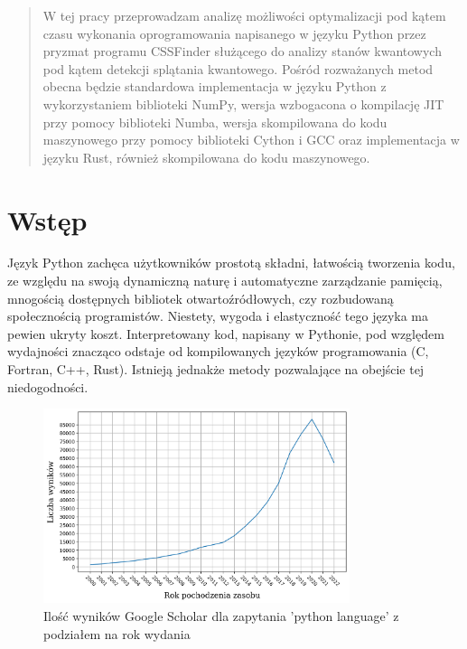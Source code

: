 \documentclass[12pt,a4paper]{article}
\begin{document}
\begin{sloppypar}

    \begin{abstract}
        W tej pracy przeprowadzam analizę możliwości optymalizacji pod kątem czasu wykonania
        oprogramowania napisanego w języku Python przez pryzmat programu CSSFinder służącego
        do analizy stanów kwantowych pod kątem detekcji splątania kwantowego. Pośród rozważanych
        metod obecna będzie standardowa implementacja w języku Python z wykorzystaniem
        biblioteki NumPy\cite{NumPy_Article}\cite{NumPy_Doc}, wersja wzbogacona o
        kompilację JIT przy pomocy biblioteki Numba\cite{Numba_Article}\cite{Numba_Doc},
        wersja skompilowana do kodu maszynowego przy pomocy biblioteki Cython i GCC oraz
        implementacja w języku Rust, również skompilowana do kodu maszynowego.

    \end{abstract}

    \section[wstęp]{Wstęp}

    Język Python zachęca użytkowników prostotą składni, łatwością tworzenia kodu, ze względu
    na swoją dynamiczną naturę i automatyczne zarządzanie pamięcią, mnogością dostępnych
    bibliotek otwartoźródłowych, czy rozbudowaną społecznością programistów.
    Niestety, wygoda i elastyczność tego języka ma pewien ukryty koszt. Interpretowany
    kod, napisany w Pythonie, pod względem wydajności znacząco odstaje od kompilowanych
    języków programowania (C, Fortran, C++, Rust). Istnieją jednakże metody pozwalające
    na obejście tej niedogodności.

    \begin{figure}[h]
        \centering
        \includegraphics[width=0.8\textwidth]{"images/python_language_results.png"}
        \caption{Ilość wyników Google Scholar dla zapytania 'python language' z podziałem na rok wydania}
    \end{figure}


\end{sloppypar}
\end{document}
